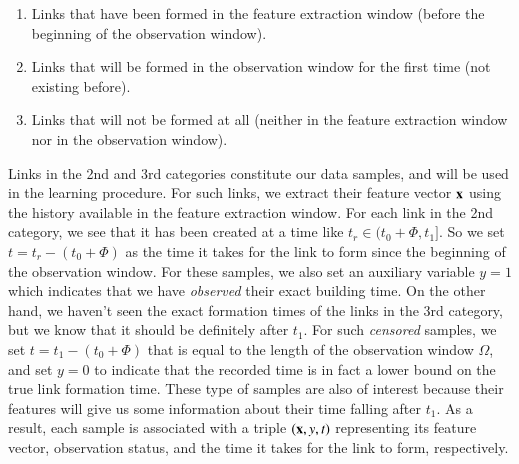 \begin{enumerate}[label=(\roman*)]
	\item Links that have been formed in the feature extraction window (before the beginning of the observation window).
	\item Links that will be formed in the observation window for the first time (not existing before).
	\item Links that will not be formed at all (neither in the feature extraction window nor in the observation window).
\end{enumerate}

Links in the 2nd and 3rd categories constitute our data samples, and will be used in the learning procedure. For such links, we extract their feature vector $\mathbf{x}$ using the history available in the feature extraction window. For each link in the 2nd category, we see that it has been created at a time like $t_r\in(t_0+\Phi,t_1]$. So we set $t=t_r-(t_0+\Phi)$ as the time it takes for the link to form since the beginning of the observation window. For these samples, we also set an auxiliary variable $y=1$ which indicates that we have \emph{observed} their exact building time. On the other hand, we haven't seen the exact formation times of the links in the 3rd category, but we know that it should be definitely after $t_1$. For such \emph{censored} samples, we set $t=t_1-(t_0+\Phi)$ that is equal to the length of the observation window $\Omega$, and set $y=0$ to indicate that the recorded time is in fact a lower bound on the true link formation time. These type of samples are also of interest because their features will give us some information about their time falling after $t_1$. As a result, each sample is associated with a triple $(\mathbf{x},y,t)$ representing its feature vector, observation status, and the time it takes for the link to form, respectively.




